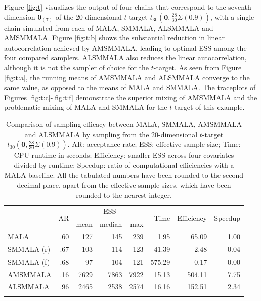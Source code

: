 \documentclass[twoside,11pt]{article}
\begin{document}
Figure \ref{fig:t} visualizes the output of four chains that correspond to the seventh dimension $\boldsymbol{\theta}_{(7)}$
of the $20$-dimensional $t$-target $t_{30}(\mathbf{0},\frac{28}{30}\Sigma(0.9))$, with a single chain simulated from each of 
MALA, SMMALA, ALSMMALA and AMSMMALA. Figure \ref{fig:t:b} shows the substantial reduction in linear autocorrelation achieved 
by AMSMMALA, leading to optimal ESS among the four compared samplers. ALSMMALA also reduces the linear autocorrelation, 
although it is not the sampler of choice for the $t$-target. As seen from Figure \ref{fig:t:a}, the running means of 
AMSMMALA and ALSMMALA converge to the same value, as opposed to the means of MALA and SMMALA. The traceplots of Figures 
\ref{fig:t:c}-\ref{fig:t:f} demonstrate the superior mixing of AMSMMALA and the problematic mixing of MALA and SMMALA for 
the $t$-target of this example.

\begin{table}
	\begin{tabular}{l|r|rrr|r|r|r}
		\hline\noalign{\smallskip}
		\multirow{2}{*}{Method} &
		\multirow{2}{*}{AR} &
		\multicolumn{3}{c|}{ESS} &
		\multirow{2}{*}{Time} &
		\multirow{2}{*}{Efficiency} &
		\multirow{2}{*}{Speedup} \\
		& & mean & median & max & & & \\
		\noalign{\smallskip}\hline\noalign{\smallskip}
		MALA & .60 & 127 & 145 & 239 & 1.95 & 65.09 & 1.00 \\
		SMMALA (r) & .67 & 103 & 114 & 123 & 41.39 & 2.48 & 0.04 \\
		SMMALA (f) & .68 & 97 & 104 & 121 & 575.29 & 0.17 & 0.00 \\
		AMSMMALA & .16 & 7629 & 7863 & 7922 & 15.13 & 504.11 & 7.75 \\
		ALSMMALA & .96 & 2465 & 2538 & 2574 & 16.16 & 152.51 & 2.34 \\	
		\noalign{\smallskip}\hline
	\end{tabular}
	\caption{Comparison of sampling efficacy between MALA, SMMALA, AMSMMALA and ALSMMALA by sampling from the $20$-dimensional
		$t$-target $t_{30}(\mathbf{0},\frac{28}{30}\Sigma(0.9))$. AR: acceptance rate; ESS: effective sample size; Time: CPU 
		runtime in seconds; Efficiency: smaller ESS across four covariates divided by runtime; Speedup: ratio of computational 
		efficiencies with a MALA baseline. All the tabulated numbers have been rounded to the second decimal place, apart from 
		the effective sample sizes, which have been rounded to the nearest integer.}
	\label{tab:t}
\end{table}
\end{document}
